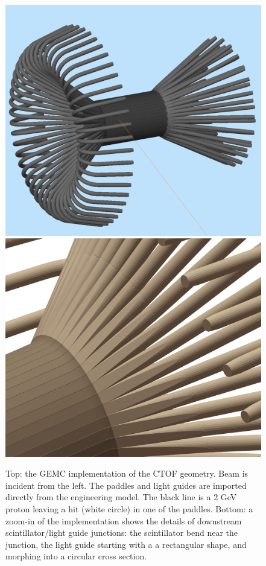 \begin{figure}
	\centering
	\includegraphics[width=0.99\columnwidth,keepaspectratio]{img/ctofGeometry.png}
	\includegraphics[width=0.99\columnwidth,keepaspectratio]{img/ctofDetail.png}
	\caption{Top: the GEMC implementation of the CTOF geometry. Beam is incident from the left.
	         The paddles and light guides are imported directly from the engineering model.
			 The black line is a 2 GeV proton leaving a hit (white circle) in one of the paddles.
			 Bottom: a zoom-in of the implementation shows the details of downstream scintillator/light guide junctions:
			 the scintillator bend near the junction, the light guide starting with a a rectangular shape, and morphing into a circular cross section.}
	\label{fig:ctofGeometry}
\end{figure}


